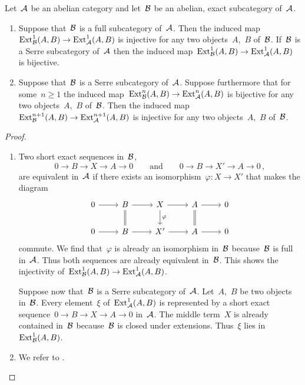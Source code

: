 \documentclass[a4paper,11pt]{scrartcl}
\begin{document}
\begin{proposition}
  \label{ext for serre subcategories}
  Let~$\mathcal{A}$ be an abelian category and let~$\mathcal{B}$ be an abelian, exact subcategory of~$\mathcal{A}$.
  \begin{enumerate}
    \item
      Suppose that~$\mathcal{B}$ is a full subcategory of~$\mathcal{A}$.
      Then the induced map~$\operatorname{Ext}^1_{\mathcal{B}}(A,B) \to \operatorname{Ext}^1_{\mathcal{A}}(A,B)$ is injective for any two objects~$A$,~$B$ of~$\mathcal{B}$.
      If~$\mathcal{B}$ is a Serre subcategory of~$\mathcal{A}$ then the induced map~$\operatorname{Ext}^1_{\mathcal{B}}(A,B) \to \operatorname{Ext}^1_{\mathcal{A}}(A,B)$ is bijective.
    \item
      Suppose that~$\mathcal{B}$ is a Serre subcategory of~$\mathcal{A}$.
      Suppose furthermore that for some~$n \geq 1$ the induced map~$\operatorname{Ext}^n_{\mathcal{B}}(A,B) \to \operatorname{Ext}^n_{\mathcal{A}}(A,B)$ is bijective for any two objects~$A$,~$B$ of~$\mathcal{B}$.
      Then the induced map~$\operatorname{Ext}^{n+1}_{\mathcal{B}}(A,B) \to \operatorname{Ext}^{n+1}_{\mathcal{A}}(A,B)$ is injective for any two objects~$A$,~$B$ of~$\mathcal{B}$. 
  \end{enumerate}
\end{proposition}


\begin{proof}
  \leavevmode
  \begin{enumerate}
    \item
      Two short exact sequences in~$\mathcal{B}$,
      \[
        0 \to B \to X \to A \to 0
        \qquad\text{and}\qquad
        0 \to B \to X' \to A \to 0 \,,
      \]
      are equivalent in~$\mathcal{A}$ if there exists an isomorphism~$\varphi \colon X \to X'$ that makes the diagram
      \[
        \begin{tikzcd}
            0
            \arrow{r}
          &
            B
            \arrow{r}
            \arrow[equal]{d}
          &
            X
            \arrow{r}
            \arrow{d}[right]{\varphi}
          &
            A
            \arrow{r}
            \arrow[equal]{d}
          &
            0
          \\
            0
            \arrow{r}
          &
            B
            \arrow{r}
          &
            X'
            \arrow{r}
          &
            A
            \arrow{r}
          &
            0
        \end{tikzcd}
      \]
      commute.
      We find that~$\varphi$ is already an isomorphism in~$\mathcal{B}$ because~$\mathcal{B}$ is full in~$\mathcal{A}$.
      Thus both sequences are already equivalent in~$\mathcal{B}$.
      This shows the injectivity of~$\operatorname{Ext}^1_{\mathcal{B}}(A,B) \to \operatorname{Ext}^1_{\mathcal{A}}(A,B)$.

      Suppose now that~$\mathcal{B}$ is a Serre subcategory of~$\mathcal{A}$.
      Let~$A$,~$B$ be two objects in~$\mathcal{B}$.
      Every element~$\xi$ of~$\operatorname{Ext}^1_{\mathcal{A}}(A,B)$ is represented by a short exact sequence~$0 \to B \to X \to A \to 0$ in~$\mathcal{A}$.
      The middle term~$X$ is already contained in~$\mathcal{B}$ because~$\mathcal{B}$ is closed under extensions.
      Thus~$\xi$ lies in~$\operatorname{Ext}^1_{\mathcal{B}}(A,B)$.
    \item
      We refer to \cite[Proposition~3.3]{yoneda_ext}.
    \qedhere
  \end{enumerate}
\end{proof}
\end{document}
